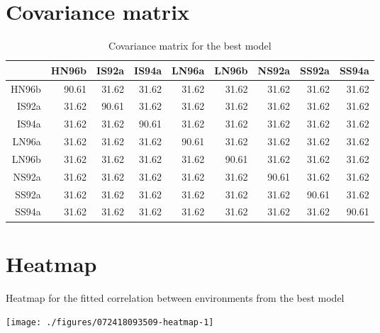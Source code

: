 \documentclass[a4paper,11pt]{article}\usepackage[]{graphicx}\usepackage[]{color}
\newenvironment{knitrout}{}{} %
\begin{document}
\section{Covariance matrix}
\begin{table}[ht]\begin{flushleft}\caption{Covariance matrix for the best model}%
\begin{tabular}{rrrrrrrrr}
  \hline
 & HN96b & IS92a & IS94a & LN96a & LN96b & NS92a & SS92a & SS94a \\ 
  \hline
HN96b & 90.61 & 31.62 & 31.62 & 31.62 & 31.62 & 31.62 & 31.62 & 31.62 \\ 
  IS92a & 31.62 & 90.61 & 31.62 & 31.62 & 31.62 & 31.62 & 31.62 & 31.62 \\ 
  IS94a & 31.62 & 31.62 & 90.61 & 31.62 & 31.62 & 31.62 & 31.62 & 31.62 \\ 
  LN96a & 31.62 & 31.62 & 31.62 & 90.61 & 31.62 & 31.62 & 31.62 & 31.62 \\ 
  LN96b & 31.62 & 31.62 & 31.62 & 31.62 & 90.61 & 31.62 & 31.62 & 31.62 \\ 
  NS92a & 31.62 & 31.62 & 31.62 & 31.62 & 31.62 & 90.61 & 31.62 & 31.62 \\ 
  SS92a & 31.62 & 31.62 & 31.62 & 31.62 & 31.62 & 31.62 & 90.61 & 31.62 \\ 
  SS94a & 31.62 & 31.62 & 31.62 & 31.62 & 31.62 & 31.62 & 31.62 & 90.61 \\ 
   \hline
\end{tabular}
\end{flushleft}\end{table}

\section{Heatmap}
Heatmap for the fitted correlation between environments from the best model
\begin{knitrout}
\color{fgcolor}

\texttt{[image: ./figures/072418093509-heatmap-1]} \hfill{}



\end{knitrout}

\end{document}
